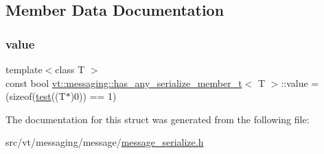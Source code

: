 \subsection{Member Data Documentation}
\mbox{\label{structvt_1_1messaging_1_1has__any__serialize__member__t_ae0ddceb2b8168f1c6abe7d51c10ac984}} 
\subsubsection{\texorpdfstring{value}{value}}
{\footnotesize\ttfamily template$<$class T $>$ \\
const bool \hyperlink{structvt_1_1messaging_1_1has__any__serialize__member__t}{vt\+::messaging\+::has\+\_\+any\+\_\+serialize\+\_\+member\+\_\+t}$<$ T $>$\+::value = (sizeof(\hyperlink{structvt_1_1messaging_1_1has__any__serialize__member__t_a6090c486385f0c86be2ff51d2304c4a7}{test}((T$\ast$)0)) == 1)\hspace{0.3cm}{\ttfamily [static]}}



The documentation for this struct was generated from the following file\+:\begin{DoxyCompactItemize}
\item 
src/vt/messaging/message/\hyperlink{message__serialize_8h}{message\+\_\+serialize.\+h}\end{DoxyCompactItemize}
